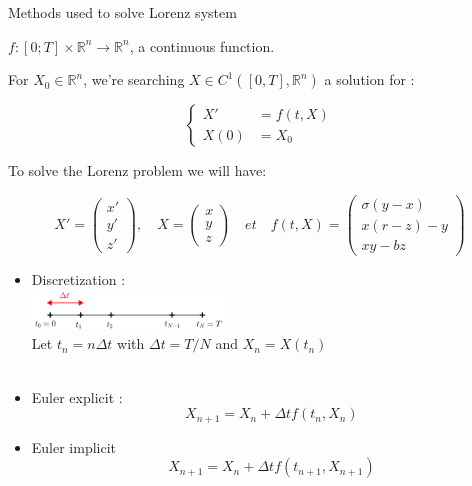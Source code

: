 \documentclass[10pt,xcolor={table,dvipsnames},t]{beamer}
\begin{document}
\begin{frame}[allowframebreaks]{Methods used to solve Lorenz system}
    
    $f : [0; T] \times \mathbb{R}^n \rightarrow \mathbb{R}^n$, \; a continuous function.

    For $X_0\in \mathbb{R}^n$, we're searching $X\in C^1([0,T],\mathbb{R}^n)$ a solution for :

    $$\left\{\begin{aligned}
        X'&=f(t,X) \\
        X(0)&=X_0
    \end{aligned}\right.$$

    To solve the Lorenz problem we will have:
    
    $$X'=\begin{pmatrix}
        x' \\
        y' \\
        z'
    \end{pmatrix}, \quad X=\begin{pmatrix}
        x \\
        y \\
        z
    \end{pmatrix} \quad et \quad f(t,X)=\begin{pmatrix}
        \sigma(y-x) \\
        x(r-z)-y \\
        xy-bz
    \end{pmatrix}$$
    
    \newpage
    
    \begin{itemize}
        \item Discretization : \\
        \quad \includegraphics[width=0.4\textwidth]{discretization.jpg} \\ 
        Let \quad $t_n=n\Delta t$ \quad with \quad $\Delta t=T/N$ \quad and \quad $X_n=X(t_n)$ \\ \; \\
        \item Euler explicit :
        $$X_{n+1}=X_n+\Delta t f(t_n,X_n)$$
        \item Euler implicit
        $$X_{n+1}=X_n+\Delta t f(t_{n+1},X_{n+1})$$
        
        \newpage
        

\end{itemize}
\end{frame}
\end{document}
